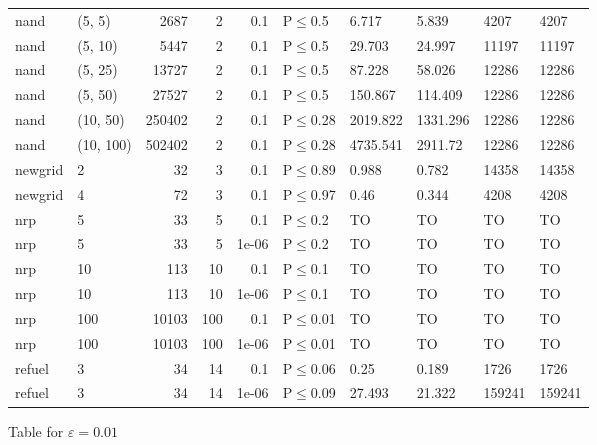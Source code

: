 \begin{longtable}{llrrrlllll}
 nand          & (5, 5)    &   	2687 &   2 & 0.1   & P$\leq$0.5   & 6.717    & 5.839    & 4207   & 4207   \\
 nand          & (5, 10)   &   	5447 &   2 & 0.1   & P$\leq$0.5   & 29.703   & 24.997   & 11197  & 11197  \\
 nand          & (5, 25)   &  	13727 &   2 & 0.1   & P$\leq$0.5   & 87.228   & 58.026   & 12286  & 12286  \\
 nand          & (5, 50)   &  	27527 &   2 & 0.1   & P$\leq$0.5   & 150.867  & 114.409  & 12286  & 12286  \\
 nand          & (10, 50)  & 	250402 &   2 & 0.1   & P$\leq$0.28  & 2019.822 & 1331.296 & 12286  & 12286  \\
 nand          & (10, 100) & 	502402 &   2 & 0.1   & P$\leq$0.28  & 4735.541 & 2911.72  & 12286  & 12286  \\
 newgrid       & 2         &     	32 &   3 & 0.1   & P$\leq$0.89  & 0.988    & 0.782    & 14358  & 14358  \\
 newgrid       & 4         &     	72 &   3 & 0.1   & P$\leq$0.97  & 0.46     & 0.344    & 4208   & 4208   \\
 nrp           & 5         &     	33 &   5 & 0.1   & P$\leq$0.2   & TO       & TO       & TO     & TO     \\
 nrp           & 5         &     	33 &   5 & 1e-06 & P$\leq$0.2   & TO       & TO       & TO     & TO     \\
 nrp           & 10        &    	113 &  10 & 0.1   & P$\leq$0.1   & TO       & TO       & TO     & TO     \\
 nrp           & 10        &    	113 &  10 & 1e-06 & P$\leq$0.1   & TO       & TO       & TO     & TO     \\
 nrp           & 100       &  	10103 & 100 & 0.1   & P$\leq$0.01  & TO       & TO       & TO     & TO     \\
 nrp           & 100       &  	10103 & 100 & 1e-06 & P$\leq$0.01  & TO       & TO       & TO     & TO     \\
 refuel        & 3         &     	34 &  14 & 0.1   & P$\leq$0.06  & 0.25     & 0.189    & 1726   & 1726   \\
 refuel        & 3         &     	34 &  14 & 1e-06 & P$\leq$0.09  & 27.493   & 21.322   & 159241 & 159241 \\
\bottomrule
\end{longtable}
\small Table for \(\varepsilon=0.01\)
